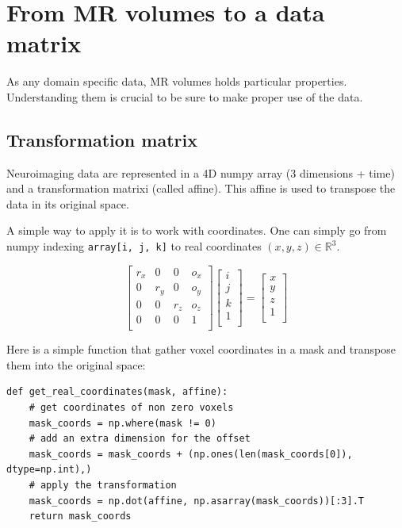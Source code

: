 \documentclass{frontiersSCNS} %
\begin{document}
\section{From MR volumes to a data matrix}

As any domain specific data, MR volumes holds particular properties.
Understanding them is crucial to be sure to make proper use of the data.

\subsection{Transformation matrix}

Neuroimaging data are represented in a 4D numpy array (3 dimensions + time) and
a transformation matrixi (called affine). This affine is used to transpose the
data in its original space.

A simple way to apply it is to work with coordinates. One can simply go from
numpy indexing \verb!array[i, j, k]! to real coordinates $(x, y, z) \in
\mathbb{R}^3$.

\[
    \begin{bmatrix}
        r_x & 0   & 0   & o_x \\
        0   & r_y & 0   & o_y \\
        0   & 0   & r_z & o_z \\
        0   & 0   & 0   & 1   \\
    \end{bmatrix}
    \begin{bmatrix}
        i \\
        j \\
        k \\
        1 \\
    \end{bmatrix}
    =
    \begin{bmatrix}
        x \\
        y \\
        z \\
        1 \\
    \end{bmatrix}
\]

Here is a simple function that gather voxel coordinates in a mask and transpose
them into the original space:


\begin{lstlisting}
def get_real_coordinates(mask, affine):
    # get coordinates of non zero voxels
    mask_coords = np.where(mask != 0)
    # add an extra dimension for the offset
    mask_coords = mask_coords + (np.ones(len(mask_coords[0]), dtype=np.int),)
    # apply the transformation
    mask_coords = np.dot(affine, np.asarray(mask_coords))[:3].T
    return mask_coords
\end{lstlisting}
\end{document}
